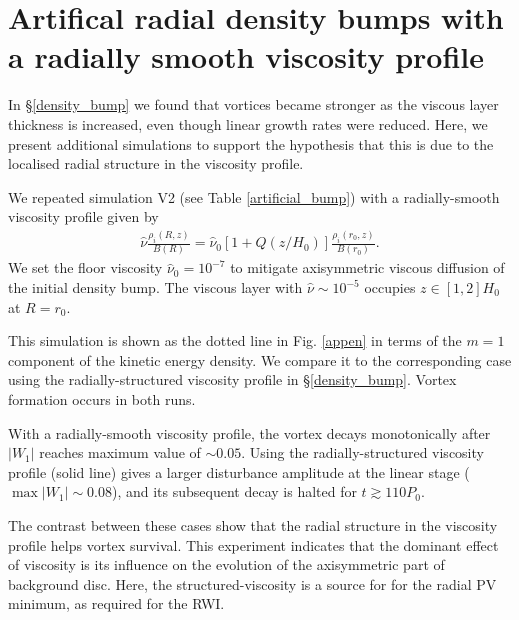 {\bf
  \section{Artifical radial density bumps with a radially smooth
    viscosity profile}\label{add_sim}
  In \S\ref{density_bump} we found that vortices became stronger
  as the viscous layer thickness is increased, even though linear growth rates
  were reduced. Here, we present additional simulations to support the 
  hypothesis that this is due to the localised radial structure in the viscosity profile. 

  We repeated simulation V2 (see Table \ref{artificial_bump})
  with a radially-smooth viscosity profile given by 
  \begin{align}\label{smooth_visc}          
    \hat{\nu}\frac{\rho_i(R,z)}{B(R)} =
    \hat{\nu}_0\left[1+Q(z/H_0) \right]\frac{\rho_i(r_0,z)}{B(r_0)}. 
  \end{align}                  
  We set the floor viscosity $\hat{\nu}_0=10^{-7}$ to mitigate
  axisymmetric viscous diffusion of the initial density bump. The
  viscous layer with $\hat{\nu} \sim 10^{-5}$ occupies $z\in[1,2]H_0$
  at $R=r_0$.   
                      
  This simulation is shown as the dotted line in Fig. \ref{appen} in
  terms of the $m=1$ component of the kinetic energy density. We
  compare it to the corresponding case using the radially-structured
  viscosity profile in \S\ref{density_bump}. Vortex formation occurs
  in both runs.  

  With a radially-smooth viscosity profile, the vortex decays 
  monotonically after $|W_1|$ reaches maximum value of $\sim 0.05$. 
  Using the radially-structured viscosity profile (solid line) gives a
  larger disturbance amplitude at the linear stage  ($\max{|W_1|}\sim
  0.08$), and its subsequent decay is halted for $t\gtrsim110P_0$.   

  The contrast between these cases show that the radial structure
  in the viscosity profile helps vortex survival. This experiment
  indicates that the dominant effect of viscosity is its
  influence on the evolution of the axisymmetric part of background
  disc. Here, the structured-viscosity is a source for for the radial
  PV minimum, as required for the RWI. 

}

